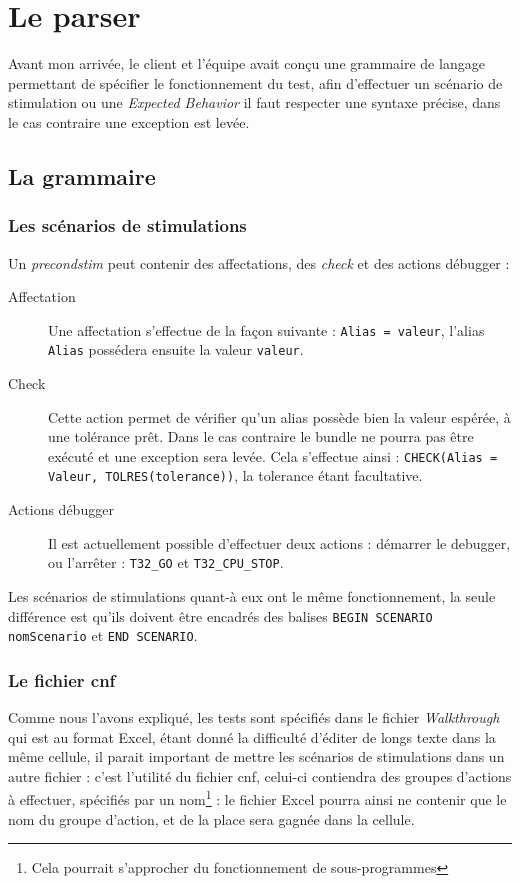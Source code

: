 	\section{Le parser}\label{sectionParser}
	Avant mon arrivée, le client et l'équipe avait conçu une grammaire de langage permettant de spécifier le fonctionnement du test, afin d'effectuer un scénario de stimulation ou une \textit{Expected Behavior} il faut respecter une syntaxe précise, dans le cas contraire une exception est levée.

	\subsection{La grammaire}\label{specParser}
	\subsubsection{Les scénarios de stimulations}
	Un \textit{precondstim} peut contenir des affectations, des \textit{check} et des actions débugger : 
	\begin{description}
		\item[Affectation] Une affectation s'effectue de la façon suivante : \texttt{Alias = valeur}, l'alias \texttt{Alias} possédera ensuite la valeur \texttt{valeur}.
		\item[Check] Cette action permet de vérifier qu'un alias possède bien la valeur espérée, à une tolérance prêt. Dans le cas contraire le bundle ne pourra pas être exécuté et une exception sera levée. Cela s'effectue ainsi : \texttt{CHECK(Alias = Valeur, TOLRES(tolerance))}, la tolerance étant facultative.
		\item[Actions débugger] Il est actuellement possible d'effectuer deux actions : démarrer le debugger, ou l'arrêter : \texttt{T32\_GO} et 
		\texttt{T32\_CPU\_STOP}.
	\end{description}

	Les scénarios de stimulations quant-à eux ont le même fonctionnement, la seule différence est qu'ils doivent être encadrés des balises \texttt{BEGIN SCENARIO nomScenario} et \texttt{END SCENARIO}.

	\subsubsection{Le fichier cnf}
	Comme nous l'avons expliqué, les tests sont spécifiés dans le fichier \textit{Walkthrough} qui est au format Excel, étant donné la difficulté d'éditer de longs texte dans la même cellule, il parait important de mettre les scénarios de stimulations dans un autre fichier : c'est l'utilité du fichier cnf, celui-ci contiendra des groupes d'actions à effectuer, spécifiés par un nom\footnote{Cela pourrait s'approcher du fonctionnement de sous-programmes} : le fichier Excel pourra ainsi ne contenir que le nom du groupe d'action, et de la place sera gagnée dans la cellule.

